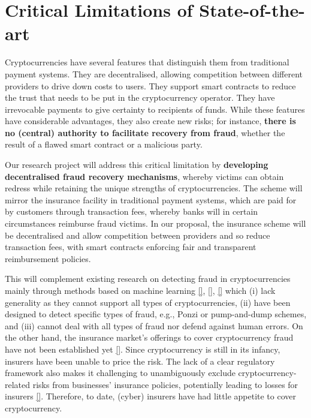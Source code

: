 
\section{Critical Limitations of State-of-the-art}\label{sec::Research-Gaps}
%
Cryptocurrencies have several features that distinguish them from traditional payment systems. They are decentralised, allowing competition between different providers to drive down costs to users. They support smart contracts to reduce the trust that needs to be put in the cryptocurrency operator. They have irrevocable payments to give certainty to recipients of funds. While these features have considerable advantages, they also create new risks; for instance, \textbf{there is no (central) authority to facilitate recovery from fraud}, whether the result of a flawed smart contract or a malicious party. 

Our research project will address this critical limitation by \textbf{developing decentralised fraud recovery mechanisms}, whereby victims can obtain redress while retaining the unique strengths of cryptocurrencies. The scheme will mirror the insurance facility in traditional payment systems, which are paid for by customers through transaction fees, whereby banks will in certain circumstances reimburse fraud victims. In our proposal, the insurance scheme will be decentralised and allow competition between providers and so reduce transaction fees, with smart contracts enforcing fair and transparent reimbursement policies. %

This will complement existing research on detecting fraud in cryptocurrencies mainly through methods based on machine learning 
% 
\href{https://core.ac.uk/download/pdf/225316624.pdf}{[\printcntr]}, \href{https://ieeexplore.ieee.org/stamp/stamp.jsp?tp=&arnumber=8946232&tag=1}{[\printcntr]}, \href{https://link.springer.com/content/pdf/10.1007/978-3-031-06791-4_18.pdf}{[\printcntr]} which (i) lack generality as they cannot support all types of cryptocurrencies, (ii) have been designed to detect specific types of fraud, e.g., Ponzi or pump-and-dump schemes, and (iii) cannot deal with all types of fraud nor defend against human errors. 
% 
On the other hand, the insurance market’s offerings to cover cryptocurrency fraud have not been established yet \href{https://www.rmmagazine.com/articles/article/2022/06/01/finding-coverage-for-cryptocurrency-losses}{[\printcntr]}. Since cryptocurrency is still in its infancy, insurers have been unable to price the risk. The lack of a clear regulatory framework also makes it challenging to unambiguously exclude cryptocurrency-related risks from businesses’ insurance policies, potentially leading to losses for insurers \href{https://news.bloomberglaw.com/insurance/crypto-risks-prompt-uptick-in-insurance-exclusions}{[\printcntr]}. Therefore, to date, (cyber) insurers have had little appetite to cover cryptocurrency. 



